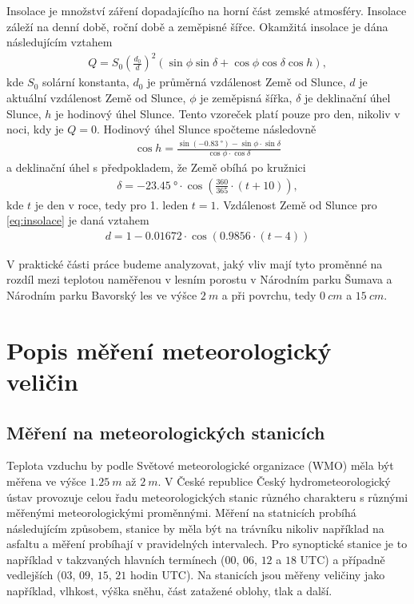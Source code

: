 Insolace je množství záření dopadajícího na horní část zemské atmosféry. Insolace záleží na denní době, roční době a zeměpisné šířce. Okamžitá insolace je dána následujícím vztahem\cite{insolace}
\begin{gather}\label{eq:insolace}
Q = S_0\left(\frac{d_0}{d}\right)^2\left(\sin\phi\sin\delta + \cos\phi\cos\delta\cos h\right),
\end{gather}
kde $S_0$ solární konstanta, $d_0$ je průměrná vzdálenost Země od Slunce, $d$ je aktuální vzdálenost Země od Slunce, $\phi$ je zeměpisná šířka, $\delta$ je deklinační úhel Slunce, $h$ je hodinový úhel Slunce. Tento vzoreček platí pouze pro den, nikoliv v noci, kdy je $Q=0$. Hodinový úhel Slunce spočteme následovně\cite{hourangle}
\begin{gather*}
\cos h = \frac{\sin \left(\SI{-0.83}{\degree}\right)-\sin\phi\cdot\sin\delta}{\cos\phi\cdot\cos\delta}
\end{gather*}
a deklinační úhel s předpokladem, že Země obíhá po kružnici\cite{declinationangle}
\begin{gather*}
\delta = \SI{-23.45}{\degree} \cdot \cos\left(\frac{360}{365}\cdot(t+10)\right),
\end{gather*}
kde $t$ je den v roce, tedy pro 1. leden $t=1$. Vzdálenost Země od Slunce pro \eqref{eq:insolace} je daná vztahem\cite{sunearthdist}
\begin{gather*}
d = 1-0.01672\cdot \cos\left(0.9856\cdot(t-4)\right)
\end{gather*}

V praktické části práce budeme analyzovat, jaký vliv mají tyto proměnné na rozdíl mezi teplotou naměřenou v lesním porostu v Národním parku Šumava a Národním parku Bavorský les ve výšce $\SI{2}{m}$ a při povrchu, tedy $\SI{0}{cm}$ a $\SI{15}{cm}$.

\section{Popis měření meteorologický veličin} \label{chap:measure}
\subsection{Měření na meteorologických stanicích}
Teplota vzduchu by podle Světové meteorologické organizace (WMO) měla být měřena ve výšce $\SI{1.25}{m}$ až $\SI{2}{m}$\cite{wmoGuidance2021}. V České republice Český hydrometeorologický ústav provozuje celou řadu meteorologických stanic různého charakteru s různými měřenými meteorologickými proměnnými. Měření na statnicích probíhá následujícím způsobem, stanice by měla být na trávníku nikoliv například na asfaltu a měření probíhají v pravidelných intervalech. Pro synoptické stanice je to například v takzvaných hlavních termínech ($00$, $06$, $12$ a $18$ UTC) a případně vedlejších ($03$, $09$, $15$, $21$ hodin UTC). Na stanicích jsou měřeny veličiny jako například, vlhkost, výška sněhu, část zatažené oblohy, tlak a další\cite{chmustanice}. 

